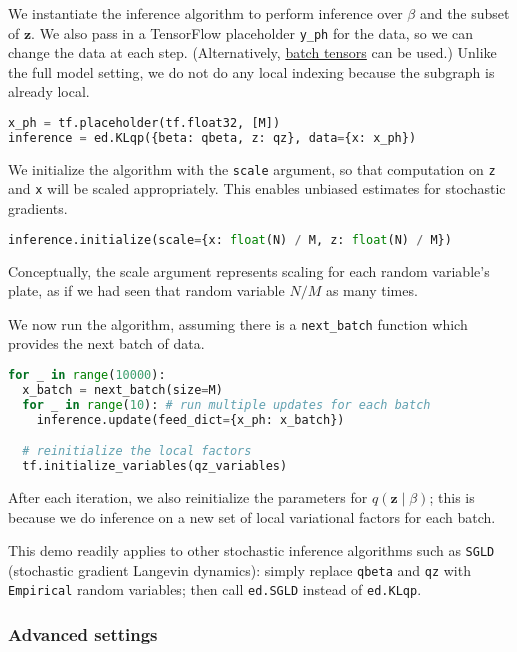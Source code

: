 We instantiate the inference algorithm to perform inference over
$\beta$ and the subset of $\mathbf{z}$.
We also pass in a TensorFlow placeholder \texttt{y_ph} for the data,
so we can change the data at each step. (Alternatively,
\href{/api/data}{batch tensors} can be used.)
Unlike the full model setting, we do not do any local indexing because
the subgraph is already local.
\begin{lstlisting}[language=Python]
x_ph = tf.placeholder(tf.float32, [M])
inference = ed.KLqp({beta: qbeta, z: qz}, data={x: x_ph})
\end{lstlisting}
We initialize the algorithm with the \texttt{scale} argument, so that
computation on \texttt{z} and \texttt{x} will be scaled appropriately.
This enables unbiased estimates for stochastic gradients.
\begin{lstlisting}[language=Python]
inference.initialize(scale={x: float(N) / M, z: float(N) / M})
\end{lstlisting}
Conceptually, the scale argument represents scaling for each random
variable’s plate, as if we had seen that random variable $N/M$ as many
times.

We now run the algorithm, assuming there is a \texttt{next_batch}
function which provides the next batch of data.
\begin{lstlisting}[language=Python]
for _ in range(10000):
  x_batch = next_batch(size=M)
  for _ in range(10): # run multiple updates for each batch
    inference.update(feed_dict={x_ph: x_batch})

  # reinitialize the local factors
  tf.initialize_variables(qz_variables)
\end{lstlisting}
After each iteration, we also reinitialize the parameters for
$q(\mathbf{z}\mid\beta)$; this is because we do inference on a new
set of local variational factors for each batch.

This demo readily applies to other stochastic inference
algorithms such as \texttt{SGLD} (stochastic gradient Langevin
dynamics): simply
replace \texttt{qbeta} and \texttt{qz} with \texttt{Empirical} random
variables; then call \texttt{ed.SGLD} instead of \texttt{ed.KLqp}.

\subsubsection{Advanced settings}

